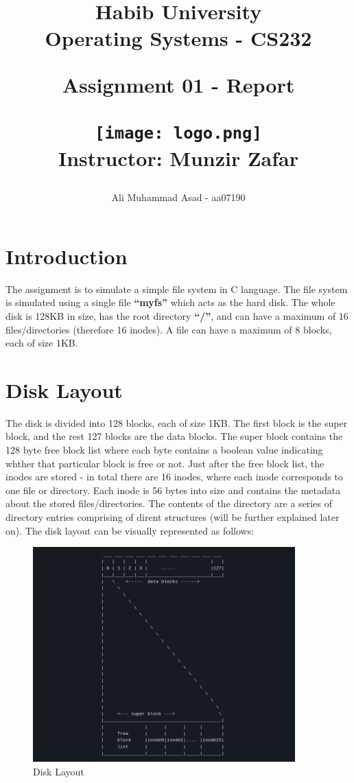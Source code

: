 \documentclass{article}
\title{{\huge \textbf{Habib University \\ Operating Systems - CS232 }}

\vspace*{5mm}
{\LARGE \textbf{Assignment 01 - Report}}

{\texttt{[image: logo.png]}} \\ 
{\Large \textbf{Instructor:} Munzir Zafar}}
\author{Ali Muhammad Asad - aa07190}
\date{}
\theoremstyle{mytheoremstyle}
\theoremstyle{mytheoremstyle}
\theoremstyle{myproblemstyle}
\begin{document}
\maketitle

\newpage
\tableofcontents

\newpage
\section{Introduction}
The assignment is to simulate a simple file system in C language. The file system is simulated using a single file \textbf{``myfs''} which acts as the hard disk. The whole disk is 128KB in size, has the root directory \textbf{``/''}, and can have a maximum of 16 files/directories (therefore 16 inodes). A file can have a maximum of 8 blocks, each of size 1KB. 

\section{Disk Layout}
The disk is divided into 128 blocks, each of size 1KB. The first block is the super block, and the rest 127 blocks are the data blocks. The super block contains the 128 byte free block list where each byte contains a boolean value indicating whther that particular block is free or not. Just after the free block list, the inodes are stored - in total there are 16 inodes, where each inode corresponds to one file or directory. Each inode is 56 bytes into size and contains the metadata about the stored files/directories. The contents of the directory are a series of directory entries comprising of dirent structures (will be further explained later on). The disk layout can be visually represented as follows:
\begin{figure}[htbp]
    \centering
    \includegraphics[width=0.9\textwidth]{disk_layout.png}
    \caption{Disk Layout}
    \label{fig:disk_layout}
\end{figure}
\end{document}
